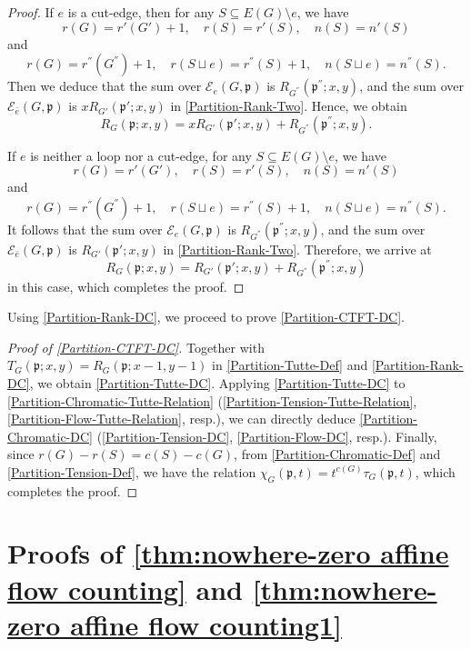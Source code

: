 \documentclass[12pt]{article}%
\numberwithin{equation}{section}
\begin{document}
\begin{proof}
If $e$ is a cut-edge, then  for any $S\subseteq E(G)\setminus e$, we have
\[
r(G)=r'(G')+1,\quad r(S)=r'(S),\quad n(S)=n'(S)
\]
and
\[
r(G)=r^{''}(G^{''})+1,\quad r(S\sqcup e)=r^{''}(S)+1,\quad n(S\sqcup e)=n^{''}(S).
\]
Then we deduce that the sum over $\mathcal{E}_e(G,\mathfrak{p})$ is $R_{G^{''}}(\mathfrak{p}^{''};x,y)$, and the sum over $\mathcal{E}_{\bar{e}}(G,\mathfrak{p})$ is $xR_{G'}(\mathfrak{p}';x,y)$ in \eqref{Partition-Rank-Two}. Hence, we obtain
\[
R_G(\mathfrak{p};x,y)=xR_{G'}(\mathfrak{p}';x,y)+R_{G^{''}}(\mathfrak{p}^{''};x,y).
\]

If $e$ is neither a loop nor a cut-edge, for any $S\subseteq E(G)\setminus e$, we have
\[
r(G)=r'(G'),\quad r(S)=r'(S),\quad n(S)=n'(S)
\]
and
\[
r(G)=r^{''}(G^{''})+1,\quad r(S\sqcup e)=r^{''}(S)+1,\quad n(S\sqcup e)=n^{''}(S).
\]
It follows that the sum over $\mathcal{E}_e(G,\mathfrak{p})$ is $R_{G^{''}}(\mathfrak{p}^{''};x,y)$, and the sum over $\mathcal{E}_{\bar{e}}(G,\mathfrak{p})$ is $R_{G'}(\mathfrak{p}';x,y)$ in \eqref{Partition-Rank-Two}. Therefore, we arrive at
\[
R_G(\mathfrak{p};x,y)=R_{G'}(\mathfrak{p}';x,y)+R_{G^{''}}(\mathfrak{p}^{''};x,y)
\]
in this case, which completes the proof.
\end{proof}

Using \autoref{Partition-Rank-DC}, we proceed to prove \autoref{Partition-CTFT-DC}.
\begin{proof}[Proof of \autoref{Partition-CTFT-DC}]
Together with  $T_G(\mathfrak{p};x,y)=R_G(\mathfrak{p};x-1,y-1)$ in \eqref{Partition-Tutte-Def} and \autoref{Partition-Rank-DC}, we obtain \eqref{Partition-Tutte-DC}. Applying \eqref{Partition-Tutte-DC} to \eqref{Partition-Chromatic-Tutte-Relation} (\eqref{Partition-Tension-Tutte-Relation}, \eqref{Partition-Flow-Tutte-Relation}, resp.), we can directly deduce
\eqref{Partition-Chromatic-DC} (\eqref{Partition-Tension-DC}, \eqref{Partition-Flow-DC}, resp.). Finally, since $r(G)-r(S)=c(S)-c(G)$, from \eqref{Partition-Chromatic-Def} and  \eqref{Partition-Tension-Def}, we have the relation $\chi_G(\mathfrak{p},t)=t^{c(G)}\tau_G(\mathfrak{p},t)$, which completes the proof.
\end{proof}


\section{Proofs of \autoref{thm:nowhere-zero affine flow counting} and \autoref{thm:nowhere-zero affine flow counting1}}\label{Sec-3}
\end{document}
